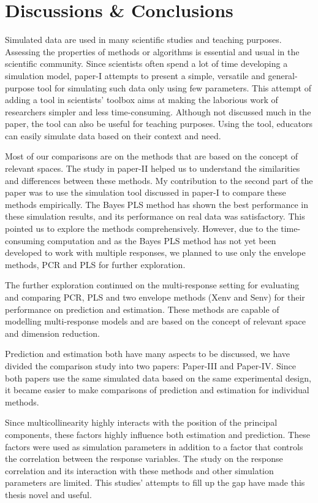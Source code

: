 \documentclass[11pt,twoside,openright,titlepage,
  headinclude,footinclude,BCOR=5mm,
  numbers=noenddot,cleardoublepage=empty,
  tablecaptionabove, dottedtoc,
  bibliography=totoc,paper=a4]{scrreprt}
\begin{document}
\hypertarget{discussions-conclusions}{%
\chapter{Discussions \& Conclusions}\label{discussions-conclusions}}

Simulated data are used in many scientific studies and teaching purposes. Assessing the properties of methods or algorithms is essential and usual in the scientific community. Since scientists often spend a lot of time developing a simulation model, paper-I attempts to present a simple, versatile and general-purpose tool for simulating such data only using few parameters. This attempt of adding a tool in scientists' toolbox aims at making the laborious work of researchers simpler and less time-consuming. Although not discussed much in the paper, the tool can also be useful for teaching purposes. Using the tool, educators can easily simulate data based on their context and need.

Most of our comparisons are on the methods that are based on the concept of relevant spaces. The study in paper-II helped us to understand the similarities and differences between these methods. My contribution to the second part of the paper was to use the simulation tool discussed in paper-I to compare these methods empirically. The Bayes PLS method has shown the best performance in these simulation results, and its performance on real data was satisfactory. This pointed us to explore the methods comprehensively. However, due to the time-consuming computation and as the Bayes PLS method has not yet been developed to work with multiple responses, we planned to use only the envelope methods, PCR and PLS for further exploration.

The further exploration continued on the multi-response setting for evaluating and comparing PCR, PLS and two envelope methods (Xenv and Senv) for their performance on prediction and estimation. These methods are capable of modelling multi-response models and are based on the concept of relevant space and dimension reduction.

Prediction and estimation both have many aspects to be discussed, we have divided the comparison study into two papers: Paper-III and Paper-IV. Since both papers use the same simulated data based on the same experimental design, it became easier to make comparisons of prediction and estimation for individual methods.

Since multicollinearity highly interacts with the position of the principal components, these factors highly influence both estimation and prediction. These factors were used as simulation parameters in addition to a factor that controls the correlation between the response variables. The study on the response correlation and its interaction with these methods and other simulation parameters are limited. This studies' attempts to fill up the gap have made this thesis novel and useful.
\end{document}
